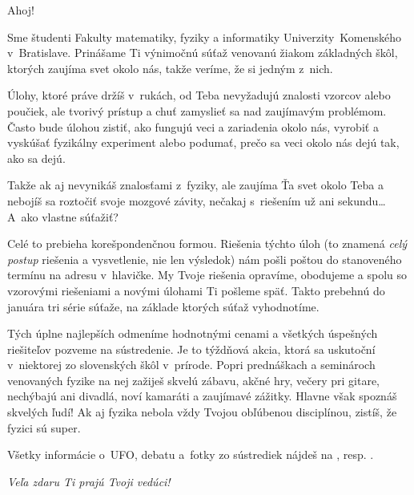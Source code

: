 Ahoj!

Sme študenti Fakulty matematiky, fyziky a informatiky
Univerzity~Komenského v~Bratislave. Prinášame Ti výnimočnú súťaž venovanú
žiakom základných škôl, ktorých zaujíma svet okolo nás, takže veríme,
že si jedným z~nich.

Úlohy, ktoré práve držíš v~rukách, od Teba nevyžadujú znalosti vzorcov
alebo poučiek, ale tvorivý prístup a chuť zamyslieť sa nad zaujímavým
problémom. Často bude úlohou zistiť, ako fungujú veci a zariadenia okolo
nás, vyrobiť a vyskúšať fyzikálny experiment alebo podumať, prečo sa veci
okolo nás dejú tak, ako sa dejú.

Takže ak aj nevynikáš znalosťami z~fyziky, ale zaujíma Ťa svet okolo
Teba a nebojíš sa roztočiť svoje mozgové závity, nečakaj s~riešením už
ani sekundu\dots A~ako vlastne súťažiť?

Celé to prebieha korešpondenčnou formou. Riešenia týchto úloh (to znamená
\emph{celý postup} riešenia a vysvetlenie, nie len výsledok) nám pošli
poštou do stanoveného termínu na adresu v~hlavičke. My Tvoje riešenia
opravíme, obodujeme a spolu so vzorovými riešeniami a novými úlohami Ti
pošleme späť. Takto prebehnú do januára tri série súťaže, na základe
ktorých súťaž vyhodnotíme.

Tých úplne najlepších odmeníme hodnotnými cenami a všetkých úspešných riešiteľov
pozveme na sústredenie. Je to týždňová akcia, ktorá sa uskutoční v~niektorej zo
slovenských škôl v~prírode. Popri prednáškach a seminároch venovaných fyzike na
nej zažiješ skvelú zábavu, akčné hry, večery pri gitare, nechýbajú ani divadlá,
noví kamaráti a zaujímavé zážitky. Hlavne však spoznáš skvelých ľudí! Ak aj
fyzika nebola vždy Tvojou obľúbenou disciplínou, zistíš, že fyzici sú super.

Všetky informácie o~UFO, debatu a~fotky zo sústrediek nájdeš na \URL{\seminarURL}, resp. .

\hfill \textit{ Veľa zdaru Ti prajú Tvoji vedúci!}%

